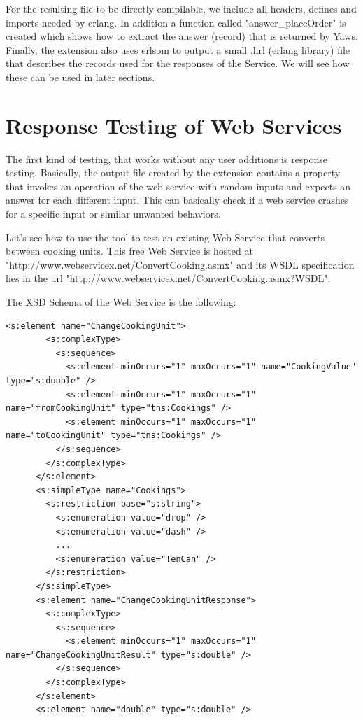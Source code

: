 \documentclass[submission,copyright,a4]{eptcs}
\begin{document}
For the resulting file to be directly compilable, we include all headers, defines and imports needed by erlang. In addition a function called "answer\_placeOrder" is created which shows how to extract the answer (record) that is returned by Yaws. Finally, the extension also uses erlsom to output a small .hrl (erlang library) file that describes the records used for the responses of the Service. We will see how these can be used in later sections.

\section{Response Testing of Web Services}

The first kind of testing, that works without any user additions is response testing. Basically, the output file created by the extension contains a property that invokes an operation of the web service with random inputs and expects an answer for each different input. This can basically check if a web service crashes for a specific input or similar unwanted behaviors. 

Let's see how to use the tool to test an existing Web Service that converts between cooking units. This free Web Service is hosted at "http://www.webservicex.net/ConvertCooking.asmx" and its WSDL specification lies in the url "http://www.webservicex.net/ConvertCooking.asmx?WSDL". 

The XSD Schema of the Web Service is the following:

\begin{lstlisting}
<s:element name="ChangeCookingUnit">
        <s:complexType>
          <s:sequence>
            <s:element minOccurs="1" maxOccurs="1" name="CookingValue" type="s:double" />
            <s:element minOccurs="1" maxOccurs="1" name="fromCookingUnit" type="tns:Cookings" />
            <s:element minOccurs="1" maxOccurs="1" name="toCookingUnit" type="tns:Cookings" />
          </s:sequence>
        </s:complexType>
      </s:element>
      <s:simpleType name="Cookings">
        <s:restriction base="s:string">
          <s:enumeration value="drop" />
          <s:enumeration value="dash" />
          ...
          <s:enumeration value="TenCan" />
        </s:restriction>
      </s:simpleType>
      <s:element name="ChangeCookingUnitResponse">
        <s:complexType>
          <s:sequence>
            <s:element minOccurs="1" maxOccurs="1" name="ChangeCookingUnitResult" type="s:double" />
          </s:sequence>
        </s:complexType>
      </s:element>
      <s:element name="double" type="s:double" />
\end{lstlisting}
\end{document}
